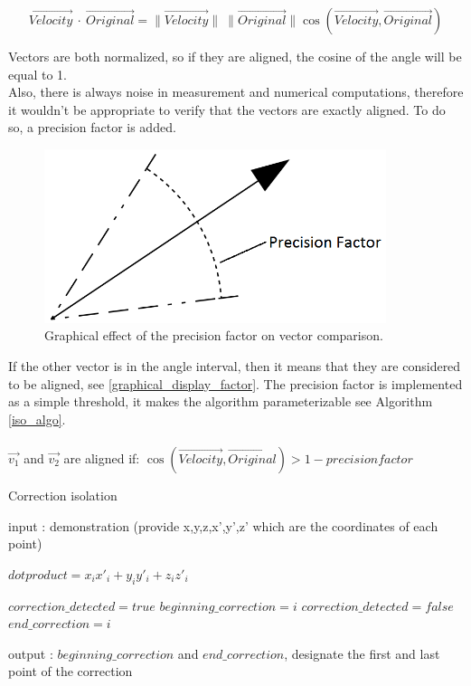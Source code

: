 $$ \overrightarrow{Velocity}\ \cdot\ \overrightarrow{Original} = \parallel\overrightarrow{Velocity}\parallel\ \parallel\overrightarrow{Original}\parallel
\cos(\overrightarrow{Velocity},\overrightarrow{Original})$$

Vectors are both normalized, so if they are aligned, the cosine of the angle will be equal to 1.\\

Also, there is always noise in measurement and numerical computations, therefore it wouldn't be appropriate to verify that the vectors are exactly aligned. To do so, a precision factor is added.

\begin{figure}[H]
\centering
\includegraphics[width=10cm]{img/precision_angle.png}
\caption{Graphical effect of the precision factor on vector comparison.}
\label{graphical_display_factor}
\end{figure}

If the other vector is in the angle interval, then it means that they are considered to be aligned, see \autoref{graphical_display_factor}. The precision factor is implemented as a simple threshold, it makes the algorithm parameterizable see Algorithm \autoref{iso_algo}.
\\
\\
$\vec{v_1}$ and $\vec{v_2}$ are aligned if: $ \cos(\overrightarrow{Velocity}, \overrightarrow{Original}) > 1 - precision factor $
\\
\begin{algorithm}[H]
  \caption{Correction isolation}
  \label{iso_algo}
  \begin{algorithmic}
  \STATE input : demonstration (provide x,y,z,x',y',z' which are the coordinates of each point)
  \STATE

      \STATE $dotproduct = x_ix'_i + y_iy'_i + z_iz'_i$

        \STATE $correction\_detected = true$
        \STATE $beginning\_correction = i$
        \STATE $correction\_detected = false$
        \STATE $end\_correction = i$
      \ENDIF
    \ENDFOR

  \STATE
  \STATE output : $beginning\_correction$ and $end\_correction$, designate the first and last point of the correction
  \end{algorithmic}
\end{algorithm}

